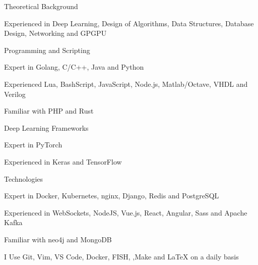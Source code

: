 \begin{cventries}
  \cventryshortlist
    {Theoretical Background}
    {
      \begin{cvitems}
        \item {Experienced in Deep Learning, Design of Algorithms, Data Structures, Database Design, Networking and GPGPU}
      \end{cvitems}
    }

  \cventryshortlist
    {Programming and Scripting}
    {
      \begin{cvitems}
        \item {Expert in Golang, C/C++, Java and Python}
        \item {Experienced Lua, BashScript, JavaScript, Node.js, Matlab/Octave, VHDL and Verilog}
        \item {Familiar with PHP and Rust}
      \end{cvitems}
    }

  \cventryshortlist
    {Deep Learning Frameworks}
    {
      \begin{cvitems}
        \item {Expert in PyTorch}
        \item {Experienced in Keras and TensorFlow}
      \end{cvitems}
    }

  \cventryshortlist
    {Technologies}
    {
      \begin{cvitems}
        \item {Expert in Docker, Kubernetes, nginx, Django, Redis and PostgreSQL}
        \item {Experienced in WebSockets, NodeJS, Vue.js, React, Angular, Sass and Apache Kafka}
        \item {Familiar with neo4j and MongoDB}
        \item {I Use Git, Vim, VS Code, Docker, FISH, ,Make and \mbox{\LaTeX} on a daily basis}
      \end{cvitems}
    }


\end{cventries}
